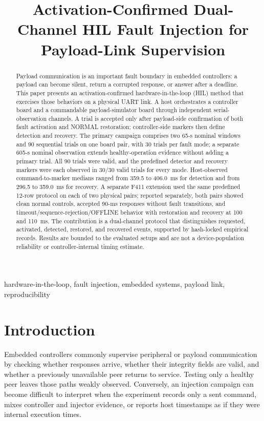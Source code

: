 \documentclass[conference]{IEEEtran}
\title{Activation-Confirmed Dual-Channel HIL Fault Injection for Payload-Link Supervision}
\author{}
\begin{document}
\maketitle

\begin{abstract}
Payload communication is an important fault boundary in embedded controllers: a payload can become silent, return a corrupted response, or answer after a deadline. This paper presents an activation-confirmed hardware-in-the-loop (HIL) method that exercises those behaviors on a physical UART link. A host orchestrates a controller board and a commandable payload-simulator board through independent serial-observation channels. A trial is accepted only after payload-side confirmation of both fault activation and NORMAL restoration; controller-side markers then define detection and recovery. The primary campaign comprises two 65-s nominal windows and 90 sequential trials on one board pair, with 30 trials per fault mode; a separate 605-s nominal observation extends healthy-operation evidence without adding a primary trial. All 90 trials were valid, and the predefined detector and recovery markers were each observed in 30/30 valid trials for every mode. Host-observed command-to-marker medians ranged from 359.5 to 406.0~ms for detection and from 296.5 to 359.0~ms for recovery. A separate F411 extension used the same predefined 12-row protocol on each of two physical pairs; reported separately, both pairs showed clean normal controls, accepted 90-ms responses without fault transitions, and timeout/sequence-rejection/OFFLINE behavior with restoration and recovery at 100 and 110~ms. The contribution is a dual-channel protocol that distinguishes requested, activated, detected, restored, and recovered events, supported by hash-locked empirical records. Results are bounded to the evaluated setups and are not a device-population reliability or controller-internal timing estimate.
\end{abstract}

\begin{IEEEkeywords}
hardware-in-the-loop, fault injection, embedded systems, payload link, reproducibility
\end{IEEEkeywords}

\section{Introduction}

Embedded controllers commonly supervise peripheral or payload communication by checking whether responses arrive, whether their integrity fields are valid, and whether a previously unavailable peer returns to service. Testing only a healthy peer leaves those paths weakly observed. Conversely, an injection campaign can become difficult to interpret when the experiment records only a sent command, mixes controller and injector evidence, or reports host timestamps as if they were internal execution times.
\end{document}
